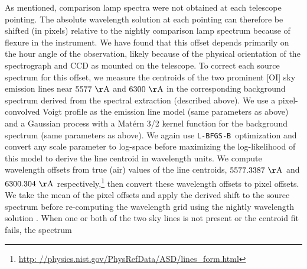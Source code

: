 \documentclass[modern, letterpaper]{aastex61}
\newcommand{\lbfgsb}{\texttt{L-BFGS-B}}
\begin{document}
As mentioned, comparison lamp spectra were not obtained at each telescope
pointing.
The absolute wavelength solution at each pointing can therefore be shifted
(in pixels) relative to the nightly comparison lamp spectrum because of flexure
in the instrument.
We have found that this offset depends primarily on the hour angle of the
observation, likely because of the physical orientation of the spectrograph and
CCD as mounted on the telescope.
To correct each source spectrum for this offset, we measure the centroids of
the two prominent [OI] sky emission lines near $5577~{\rm \AA}$ and $6300~{\rm
\AA}$ in the corresponding background spectrum derived from the spectral
extraction (described above).
We use a pixel-convolved Voigt profile as the emission line model (same
parameters as above) and a Gaussian process with a Mat\'ern 3/2 kernel function
for the background spectrum (same parameters as above).
We again use \lbfgsb\ optimization and convert any scale parameter to log-space
before maximizing the log-likelihood of this model to derive the line centroid
in wavelength units.
We compute wavelength offsets from true (air) values of the line centroids,
$5577.3387~{\rm \AA}$ and $6300.304~{\rm \AA}$ respectively,\footnote{\url{http:
//physics.nist.gov/PhysRefData/ASD/lines_form.html}} then convert these
wavelength offsets to pixel offsets.
We take the mean of the pixel offsets and apply the derived shift to the source
spectrum before re-computing the wavelength grid using the nightly wavelength
solution .
When one or both of the two sky lines is not present or the centroid fit fails,
the spectrum 
\end{document}
